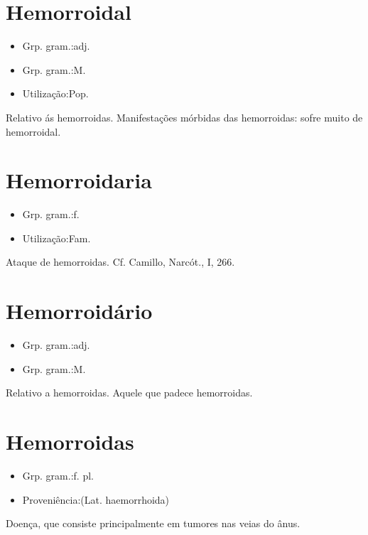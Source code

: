 \documentclass{article}
\begin{document}
\section{Hemorroidal}
\begin{itemize}
\item {Grp. gram.:adj.}
\end{itemize}
\begin{itemize}
\item {Grp. gram.:M.}
\end{itemize}
\begin{itemize}
\item {Utilização:Pop.}
\end{itemize}
Relativo ás hemorroidas.
Manifestações mórbidas das hemorroidas: \textunderscore sofre muito de hemorroidal\textunderscore .
\section{Hemorroidaria}
\begin{itemize}
\item {Grp. gram.:f.}
\end{itemize}
\begin{itemize}
\item {Utilização:Fam.}
\end{itemize}
Ataque de hemorroidas. Cf. Camillo, \textunderscore Narcót.\textunderscore , I, 266.
\section{Hemorroidário}
\begin{itemize}
\item {Grp. gram.:adj.}
\end{itemize}
\begin{itemize}
\item {Grp. gram.:M.}
\end{itemize}
Relativo a hemorroidas.
Aquele que padece hemorroidas.
\section{Hemorroidas}
\begin{itemize}
\item {Grp. gram.:f. pl.}
\end{itemize}
\begin{itemize}
\item {Proveniência:(Lat. \textunderscore haemorrhoida\textunderscore )}
\end{itemize}
Doença, que consiste principalmente em tumores nas veias do ânus.
\end{document}
